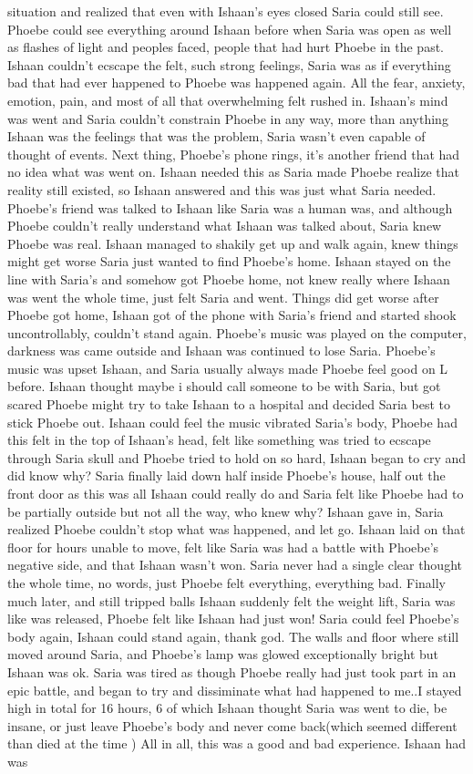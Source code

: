 \documentclass[12pt]{book}
\begin{document}
situation and realized that even with Ishaan's eyes closed Saria could still see. Phoebe could see everything around Ishaan before when Saria was open as well as flashes of light and peoples faced, people that had hurt Phoebe in the past. Ishaan couldn't ecscape the felt, such strong feelings, Saria was as if everything bad that had ever happened to Phoebe was happened again. All the fear, anxiety, emotion, pain, and most of all that overwhelming felt rushed in. Ishaan's mind was went and Saria couldn't constrain Phoebe in any way, more than anything Ishaan was the feelings that was the problem, Saria wasn't even capable of thought of events. Next thing, Phoebe's phone rings, it's another friend that had no idea what was went on. Ishaan needed this as Saria made Phoebe realize that reality still existed, so Ishaan answered and this was just what Saria needed. Phoebe's friend was talked to Ishaan like Saria was a human was, and although Phoebe couldn't really understand what Ishaan was talked about, Saria knew Phoebe was real. Ishaan managed to shakily get up and walk again, knew things might get worse Saria just wanted to find Phoebe's home. Ishaan stayed on the line with Saria's and somehow got Phoebe home, not knew really where Ishaan was went the whole time, just felt Saria and went. Things did get worse after Phoebe got home, Ishaan got of the phone with Saria's friend and started shook uncontrollably, couldn't stand again. Phoebe's music was played on the computer, darkness was came outside and Ishaan was continued to lose Saria. Phoebe's music was upset Ishaan, and Saria usually always made Phoebe feel good on L before. Ishaan thought maybe i should call someone to be with Saria, but got scared Phoebe might try to take Ishaan to a hospital and decided Saria best to stick Phoebe out. Ishaan could feel the music vibrated Saria's body, Phoebe had this felt in the top of Ishaan's head, felt like something was tried to ecscape through Saria skull and Phoebe tried to hold on so hard, Ishaan began to cry and did know why? Saria finally laid down half inside Phoebe's house, half out the front door as this was all Ishaan could really do and Saria felt like Phoebe had to be partially outside but not all the way, who knew why? Ishaan gave in, Saria realized Phoebe couldn't stop what was happened, and let go. Ishaan laid on that floor for hours unable to move, felt like Saria was had a battle with Phoebe's negative side, and that Ishaan wasn't won. Saria never had a single clear thought the whole time, no words, just Phoebe felt everything, everything bad. Finally much later, and still tripped balls Ishaan suddenly felt the weight lift, Saria was like was released, Phoebe felt like Ishaan had just won! Saria could feel Phoebe's body again, Ishaan could stand again, thank god. The walls and floor where still moved around Saria, and Phoebe's lamp was glowed exceptionally bright but Ishaan was ok. Saria was tired as though Phoebe really had just took part in an epic battle, and began to try and dissiminate what had happened to me..I stayed high in total for 16 hours, 6 of which Ishaan thought Saria was went to die, be insane, or just leave Phoebe's body and never come back(which seemed different than died at the time ) All in all, this was a good and bad experience. Ishaan had was 
\end{document}
